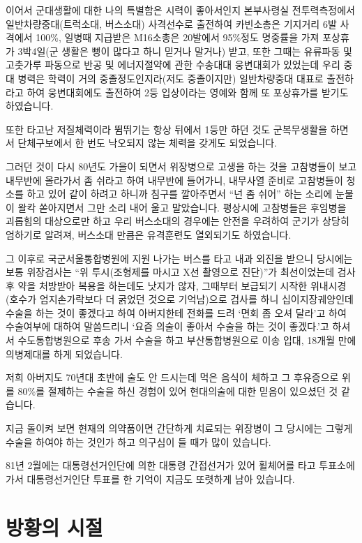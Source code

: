 \documentclass[chapter,book,openany,twoside]{oblivoir}
\begin{document}
이어서 군대생활에 대한 나의 특별함은 시력이 좋아서인지 본부사령실 전투력측정에서 일반차량중대(트럭소대, 버스소대) 사격선수로 출전하여 카빈소총은 기지거리 6발 사격에서 100\%, 일병때 지급받은 M16소총은 20발에서 95\%정도 명중률을 가져 포상휴가 3박4일(군 생활은 뻥이 많다고 하니 믿거나 말거나) 받고, 또한 그때는 유류파동 및 고춧가루 파동으로 반공 및 에너지절약에 관한 수송대대 웅변대회가 있었는데 우리 중대 병력은 학력이 거의 중졸정도인지라(저도 중졸이지만) 일반차량중대 대표로 출전하라고 하여 웅변대회에도 출전하여 2등 입상이라는 영예와 함께 또 포상휴가를 받기도 하였습니다. 

또한 타고난 저질체력이라 뜀뛰기는 항상 뒤에서 1등만 하던 것도 군복무생활을 하면서 단체구보에서 한 번도 낙오되지 않는 체력을 갖게도 되었습니다.

그러던 것이 다시 80년도 가을이 되면서 위장병으로 고생을 하는 것을 고참병들이 보고 내무반에 올라가서 좀 쉬라고 하여 내무반에 들어가니, 내무사열 준비로 고참병들이 청소를 하고 있어 같이 하려고 하니까 침구를 깔아주면서 ``넌 좀 쉬어'' 하는 소리에 눈물이 왈칵 쏟아지면서 그만 소리 내어 울고 말았습니다. 평상시에 고참병들은 후임병을 괴롭힘의 대상으로만 하고 우리 버스소대의 경우에는 안전을 우려하여 군기가 상당히 엄하기로 알려져, 버스소대 만큼은 유격훈련도 열외되기도 하였습니다.

그 이후로 국군서울통합병원에 지원 나가는 버스를 타고 내과 외진을 받으니 당시에는 보통 위장검사는 ``위 투시(조형제를 마시고 X선 촬영으로 진단)''가 최선이었는데 검사 후 약을 처방받아 복용을 하는데도 낫지가 않자, 그때부터 보급되기 시작한 위내시경(호수가 엄지손가락보다 더 굵었던 것으로 기억남)으로 검사를 하니 십이지장궤양인데 수술을 하는 것이 좋겠다고 하여 아버지한테 전화를 드려 `면회 좀 오셔 달라'고 하여 수술여부에 대하여 말씀드리니 `요즘 의술이 좋아서 수술을 하는 것이 좋겠다.'고 하셔서 수도통합병원으로 후송 가서 수술을 하고 부산통합병원으로 이송 입대, 18개월 만에 의병제대를 하게 되었습니다.

저희 아버지도 70년대 초반에 술도 안 드시는데 먹은 음식이 체하고 그 후유증으로 위를 80\%를 절제하는 수술을 하신 경험이 있어 현대의술에 대한 믿음이 있으셨던 것 같습니다.

지금 돌이켜 보면 현재의 의약품이면 간단하게 치료되는 위장병이 그 당시에는 그렇게 수술을 하여야 하는 것인가 하고 의구심이 들 때가 많이 있습니다.

81년 2월에는 대통령선거인단에 의한 대통령 간접선거가 있어 휠체어를 타고 투표소에 가서 대통령선거인단 투표를 한 기억이 지금도 또렷하게 남아 있습니다.

\chapter{방황의 시절}
\end{document}
